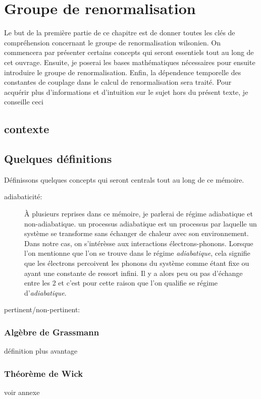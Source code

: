 \chapter{Groupe de renormalisation}
\begin{Abstract}
    \begin{changemargin}{2cm}{2cm}
    Le but de la première partie de ce chapitre est de donner toutes les clés de compréhension concernant le groupe de renormalisation wilsonien. On commencera par présenter certains concepts qui seront essentiels tout au long de cet ouvrage. Ensuite, je poserai les bases mathématiques nécessaires pour ensuite introduire le groupe de renormalisation. Enfin, la dépendence temporelle des constantes de couplage dans le calcul de renormalisation sera traité. Pour acquérir plus d'informations et d'intuition sur le sujet hors du présent texte, je conseille ceci\cite{ma_introduction_1973}
    \end{changemargin}
\end{Abstract}
\section{contexte}
\section{Quelques définitions}
Définissons quelques concepts qui seront centrals tout au long de ce mémoire.
\begin{description} 
    \item[adiabaticité:] À plusieurs reprises dans ce mémoire, je parlerai de régime adiabatique et non-adiabatique. un processus adiabatique est un processus par laquelle un système se transforme sans échanger de chaleur avec son environnement. Dans notre cas, on s'intérèsse aux interactions électrons-phonons. Lorsque l'on mentionne que l'on se trouve dans le régime \textit{adiabatique}, cela signifie que les électrons percoivent les phonons du système comme étant fixe ou ayant une constante de ressort infini. Il y a alors peu ou pas d'échange entre les 2 et c'est pour cette raison que l'on qualifie se régime d'\textit{adiabatique}.
    \item[pertinent/non-pertinent: ]  
\end{description}
\subsection{Algèbre de Grassmann}
définition plus avantage 
\subsection{Théorème de Wick}
voir annexe
